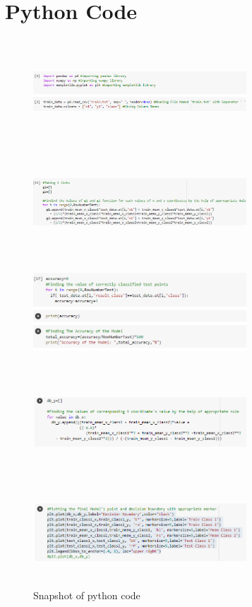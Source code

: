\documentclass[conference]{IEEEtran}
\begin{document}
\section{Python Code}
\begin{figure}[htbp]
\centerline{\includegraphics[width=8cm, height=4cm]{1.png}}
\centerline{\includegraphics[width=8cm, height=4cm]{3.png}}
\centerline{\includegraphics[width=8cm, height=4cm]{5.png}}
\centerline{\includegraphics[width=8cm, height=4cm]{7.png}}
\centerline{\includegraphics[width=8cm, height=4cm]{6.png}}
\caption{Snapshot of python code}
\label{fig}
\end{figure}
\end{document}
